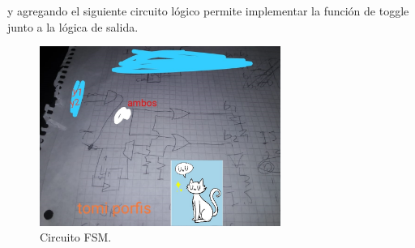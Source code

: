 y agregando el siguiente circuito lógico permite implementar la función de toggle junto a la lógica de salida.
 \begin{figure}[H]
	\centering
	\includegraphics[width=0.7\textwidth]{ImagenesEjercicio1/post_logic.jpeg}
	\caption{Circuito FSM.}
	\label{fig:fsm}
\end{figure}

